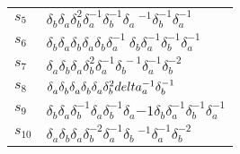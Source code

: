 \documentclass{article}
\begin{document}
\begin{center}
\begin{tabular}{ll}
$s_{5}$ & $\delta_b^{}\delta_a^{}\delta_b^{2}\delta_a^{-1}\delta_b^{-1}\delta_a\
^{-1}\delta_b^{-1}\delta_a^{-1}$ \\
$s_{6}$ & $\delta_b^{}\delta_a^{}\delta_b^{}\delta_a^{}\delta_b^{}\delta_a^{-1}\
\delta_b^{}\delta_a^{-1}\delta_b^{-1}\delta_a^{-1}$ \\
$s_{7}$ & $\delta_a^{}\delta_b^{}\delta_a^{}\delta_b^{2}\delta_a^{-1}\delta_b^{\
-1}\delta_a^{-1}\delta_b^{-2}$ \\
$s_{8}$ & $\delta_a^{}\delta_b^{}\delta_a^{}\delta_b^{}\delta_a^{}\delta_b^{2}\\
delta_a^{-1}\delta_b^{-1}$ \\
$s_{9}$ & $\delta_b^{}\delta_a^{}\delta_b^{-1}\delta_a^{}\delta_b^{-1}\delta_a^\
{-1}\delta_b^{}\delta_a^{-1}\delta_b^{-1}\delta_a^{-1}$ \\
$s_{10}$ & $\delta_a^{}\delta_b^{}\delta_a^{}\delta_b^{-2}\delta_a^{-1}\delta_b\
^{-1}\delta_a^{-1}\delta_b^{-2}$ \\
\bottomrule
\end{tabular}
\end{center}

\thispagestyle{empty}
\end{document}
